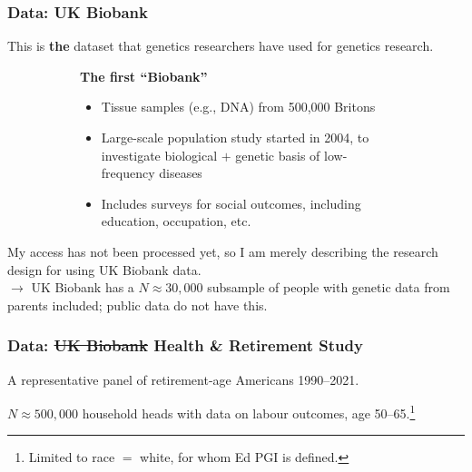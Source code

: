 \documentclass[dvipsnames,handout]{beamer} %
\begin{document}
\begin{frame}[noframenumbering]
    \frametitle{Data: UK Biobank}
    This is \textbf{the} dataset that genetics researchers have used for genetics research.
    \vspace{-0.5cm}
    \begin{figure}[h!]
        \centering
        \singlespacing
        \begin{subfigure}[c]{0.45\textwidth}
            \centering
        \end{subfigure}
        \hfill
        \begin{subfigure}[c]{0.525\textwidth}
            \textbf{The first ``Biobank''}
            \begin{itemize}
                \item Tissue samples (e.g., DNA) from 500,000 Britons
                \item Large-scale population study started in 2004, to investigate biological $+$ genetic basis of low-frequency diseases
                \item Includes surveys for social outcomes, including education, occupation, etc.
            \end{itemize}
        \end{subfigure}
    \end{figure}
    \vfill
    My access has not been processed yet, so I am merely describing the research design for using UK Biobank data. \\
    $\to$ UK Biobank has a $N \approx 30,000$ subsample of people with genetic data from parents included; public data do not have this.
\end{frame}
\begin{frame}[noframenumbering]
    \frametitle{Data: \sout{UK Biobank} Health \& Retirement Study}
    A representative panel of retirement-age Americans 1990--2021.
    \vspace{-0.5cm}

    \begin{figure}
        \centering
        \singlespacing
        \begin{subfigure}[b]{0.495\textwidth}
            \centering
            \label{fig:edyears-hist}
        \end{subfigure}
        \begin{subfigure}[b]{0.495\textwidth}
            \centering
            \label{fig:earnings-hist}
        \end{subfigure}
    \end{figure}
    \vspace{-0.5cm}
    $N \approx 500,000$ household heads with data on labour outcomes, age 50--65.\footnote[frame]{Limited to race $=$ white, for whom Ed PGI is defined.}
\end{frame}
\end{document}
